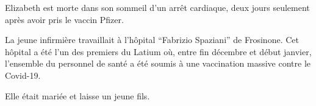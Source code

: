 Elizabeth est morte dans son sommeil d'un arrêt cardiaque, deux jours seulement
après avoir pris le vaccin Pfizer.

La jeune infirmière travaillait à l'hôpital “Fabrizio Spaziani” de
Frosinone. Cet hôpital a été l'un des premiers du Latium où, entre fin décembre
et début janvier, l'ensemble du personnel de santé a été soumis à une
vaccination massive contre le Covid-19.

Elle était mariée et laisse un jeune fils.

